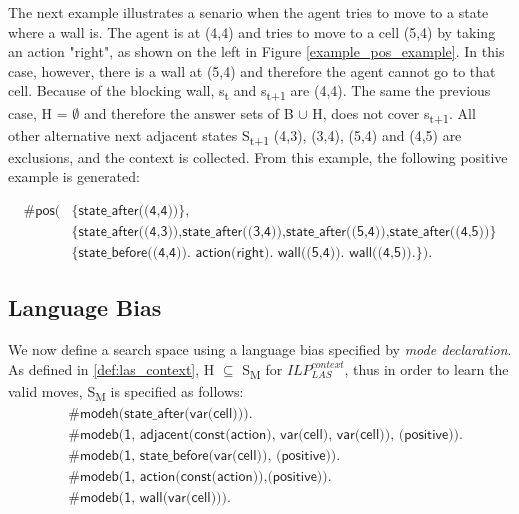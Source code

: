 \begin{examp}
The next example illustrates a senario when the agent tries to move to a state where a wall is. 
The agent is at (4,4) and tries to move to a cell (5,4) by taking an action "right", as shown on the left in Figure \ref{example_pos_example}. 
In this case, however, there is a wall at (5,4) and therefore the agent cannot go to that cell.
Because of the blocking wall, s\textsubscript{t} and s\textsubscript{t+1} are (4,4).
The same the previous case, H = $\emptyset$ and therefore the answer sets of B $\cup$ H, does not cover s\textsubscript{t+1}.
All other alternative next adjacent states S\textsubscript{t+1} (4,3), (3,4), (5,4) and (4,5) are exclusions, and the context is collected.
From this example, the following positive example is generated:

\begin{equation}
\begin{split}
\textsf{\#pos(} & \textsf{\{state\_after((4,4))\}}, \\
                & \textsf{\{state\_after((4,3)),state\_after((3,4)),state\_after((5,4)),state\_after((4,5))\}} \\
                & \textsf{\{state\_before((4,4)). action(right). wall((5,4)). wall((4,5)).\}).}
\end{split}
\end{equation}

\end{examp}
\label{state_transition_example}

\subsection{Language Bias}
\label{subsec:language_bias}
We now define a search space using a language bias specified by \textit{mode declaration}.
As defined in \ref{def:las_context}, H $\subseteq$ S\textsubscript{M} for $ILP_{LAS}^{context}$, thus in order to learn the valid moves, S\textsubscript{M} is specified as follows:
\begin{equation} \label{eq:sm}
\begin{split}
&\textsf{\#modeh(state\_after(var(cell))).}\\
&\textsf{\#modeb(1, adjacent(const(action), var(cell), var(cell)), (positive)).} \\
&\textsf{\#modeb(1, state\_before(var(cell)), (positive)).} \\
&\textsf{\#modeb(1, action(const(action)),(positive)).} \\
&\textsf{\#modeb(1, wall(var(cell))).} \\
\end{split}
\end{equation}

